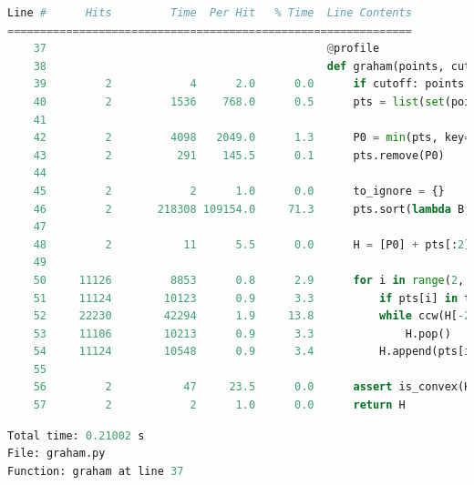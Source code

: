 \documentclass[11pt,a4paper]{article}
\begin{document}
\begin{landscape}
\begin{lstlisting}[language=Python]
Line #      Hits         Time  Per Hit   % Time  Line Contents
==============================================================
    37                                           @profile
    38                                           def graham(points, cutoff=False):
    39         2            4      2.0      0.0      if cutoff: points = interior_elimination(points)
    40         2         1536    768.0      0.5      pts = list(set(points)) 
    41                                           
    42         2         4098   2049.0      1.3      P0 = min(pts, key=lambda p: (p[1], p[0]))
    43         2          291    145.5      0.1      pts.remove(P0)
    44                                           
    45         2            2      1.0      0.0      to_ignore = {}
    46         2       218308 109154.0     71.3      pts.sort(lambda B, C: compare(P0, B, C, to_ignore))
    47                                           
    48         2           11      5.5      0.0      H = [P0] + pts[:2]
    49                                           
    50     11126         8853      0.8      2.9      for i in range(2, len(pts)):
    51     11124        10123      0.9      3.3          if pts[i] in to_ignore: continue
    52     22230        42294      1.9     13.8          while ccw(H[-2], H[-1], pts[i]) <= 0:
    53     11106        10213      0.9      3.3              H.pop()
    54     11124        10548      0.9      3.4          H.append(pts[i])
    55                                           
    56         2           47     23.5      0.0      assert is_convex(H)
    57         2            2      1.0      0.0      return H
\end{lstlisting}

\begin{lstlisting}[language=Python]
Total time: 0.21002 s
File: graham.py
Function: graham at line 37


\end{lstlisting}
\end{landscape}
\end{document}
